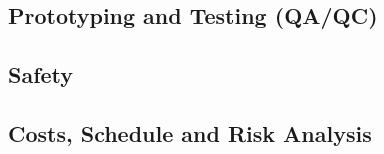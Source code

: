 \subsection{Prototyping and Testing (QA/QC)}
\label{sec:fdsp-tc-infr-qaqc}


\subsection{Safety}
\label{sec:fdsp-tc-infr-safety}


\subsection{Costs, Schedule and Risk Analysis}
\label{sec:fdsp-tc-infr-cost}

